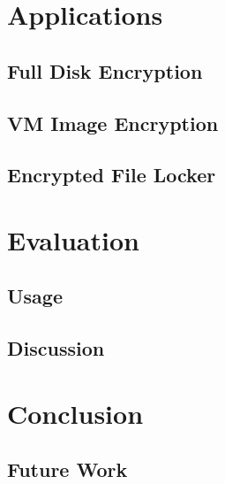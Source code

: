 \documentclass[letterpaper,twocolumn,10pt]{article}
\begin{document}



\section{Applications}
\label{sec:apps}

\subsection{Full Disk Encryption}

\subsection{VM Image Encryption}

\subsection{Encrypted File Locker}

\section{Evaluation}
\label{sec:eval}

\subsection{Usage}

\subsection{Discussion}

\section{Conclusion}
\label{sec:conclusion}

\subsection{Future Work}

{
  \footnotesize
  
  
}
\end{document}
